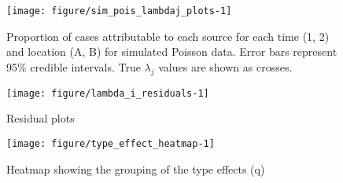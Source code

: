 \begin{knitrout}
\color{fgcolor}\begin{figure}

{\centering \texttt{[image: figure/sim\_pois\_lambdaj\_plots-1]} 

}

\caption[Proportion of cases attributable to each source for each time (1, 2) and location (A, B) for simulated Poisson data]{Proportion of cases attributable to each source for each time (1, 2) and location (A, B) for simulated Poisson data. Error bars represent 95\% credible intervals. True $\lambda_j$ values are shown as crosses.}\label{fig:sim_pois_lambdaj_plots}
\end{figure}


\end{knitrout}


\begin{knitrout}
\color{fgcolor}\begin{figure}

{\centering \texttt{[image: figure/lambda\_i\_residuals-1]} 

}

\caption[Residual plots]{Residual plots}\label{fig:lambda_i_residuals}
\end{figure}


\end{knitrout}


\begin{knitrout}
\color{fgcolor}\begin{figure}

{\centering \texttt{[image: figure/type\_effect\_heatmap-1]} 

}

\caption[Heatmap showing the grouping of the type effects (q)]{Heatmap showing the grouping of the type effects (q)}\label{fig:type_effect_heatmap}
\end{figure}


\end{knitrout}


